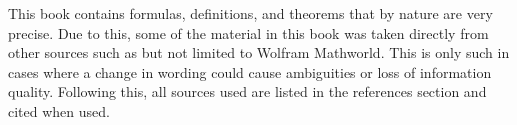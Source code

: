 This book contains formulas, definitions, and theorems that by nature are very precise. Due to this, some of the material in this book was taken directly from other sources such as but not limited to Wolfram Mathworld. This is only such in cases where a change in wording could cause ambiguities or loss of information quality.  Following this, all sources used are listed in the references section and cited when used.